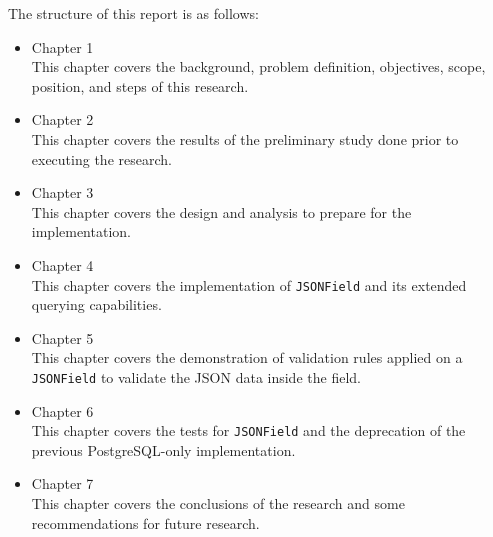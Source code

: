 The structure of this report is as follows:

\begin{itemize}
    \item Chapter 1 \babSatu \\
        This chapter covers the background, problem definition, objectives,
        scope, position, and steps of this research.
    \item Chapter 2 \babDua \\
        This chapter covers the results of the preliminary study done prior to
        executing the research.
    \item Chapter 3 \babTiga \\
        This chapter covers the design and analysis to prepare for the
        implementation.
    \item Chapter 4 \babEmpat \\
        This chapter covers the implementation of \verb|JSONField| and its
        extended querying capabilities.
    \item Chapter 5 \babLima \\
        This chapter covers the demonstration of validation rules applied on
        a \verb|JSONField| to validate the JSON data inside the field.
    \item Chapter 6 \babEnam \\
        This chapter covers the tests for \verb|JSONField| and the deprecation
        of the previous PostgreSQL-only implementation.
    \item Chapter 7 \kesimpulan \\
        This chapter covers the conclusions of the research and some
        recommendations for future research.
\end{itemize}

